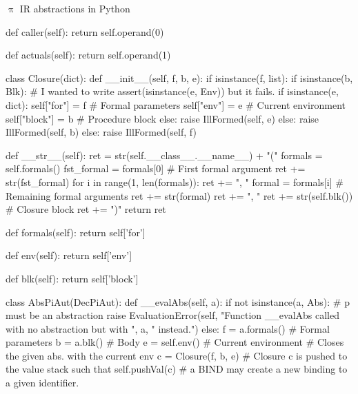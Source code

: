 \documentclass{beamer}
\begin{document}
\begin{frame}{{\color{red}$\uppi$ IR} abstractions in Python}
\begin{python}
    def caller(self):
        return self.operand(0)

    def actuals(self):
        return self.operand(1)

class Closure(dict):
    def __init__(self, f, b, e):
        if isinstance(f, list):
            if isinstance(b, Blk):
                # I wanted to write assert(isinstance(e, Env)) but it fails.
                if isinstance(e, dict):
                    self["for"] = f             # Formal parameters
                    self["env"] = e             # Current environment
                    self["block"] = b           # Procedure block
                else:
                    raise IllFormed(self, e)
            else:
                raise IllFormed(self, b)
        else:
            raise IllFormed(self, f)

    def __str__(self):
        ret = str(self.__class__.__name__) + "("
        formals = self.formals()
        fst_formal = formals[0]     # First formal argument
        ret += str(fst_formal)
        for i in range(1, len(formals)):
            ret += ", "
            formal = formals[i]     # Remaining formal arguments
            ret += str(formal)
        ret += ", "
        ret += str(self.blk())      # Closure block
        ret += ")"
        return ret

    def formals(self):
        return self['for']

    def env(self):
        return self['env']

    def blk(self):
        return self['block']

class AbsPiAut(DecPiAut):
    def __evalAbs(self, a):
        if not isinstance(a, Abs):  # p must be an abstraction
            raise EvaluationError(self, "Function __evalAbs called with no abstraction but with ", a, " instead.")
        else:
            f = a.formals()             # Formal parameters
            b = a.blk()                 # Body
            e = self.env()              # Current environment
            # Closes the given abs. with the current env
            c = Closure(f, b, e)
            # Closure c is pushed to the value stack such that
            self.pushVal(c)
            # a BIND may create a new binding to a given identifier.


\end{python}
\end{frame}
\end{document}
